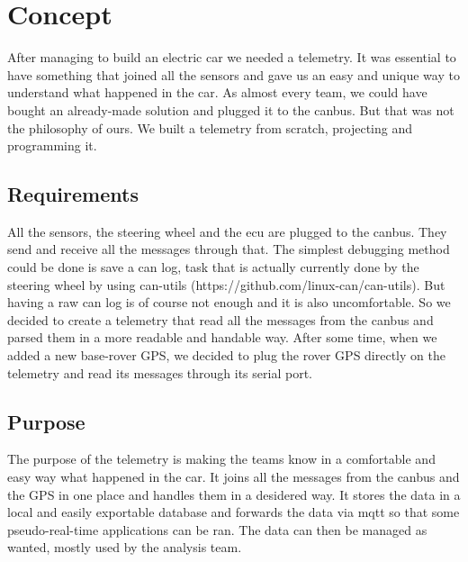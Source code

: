 \section{\huge{Concept}}
After managing to build an electric car we needed a telemetry. It was essential to have something that joined all the sensors and gave us an
easy and unique way to understand what happened in the car. As almost every team, we could have bought an already-made solution and plugged it
to the canbus. But that was not the philosophy of ours. We built a telemetry from scratch, projecting and programming it.

\subsection{Requirements}
All the sensors, the steering wheel and the ecu are plugged to the canbus. They send and receive all the messages through that. The simplest 
debugging method could be done is save a can log, task that is actually currently done by the steering wheel by using can-utils (https://github.com/linux-can/can-utils).
But having a raw can log is of course not enough and it is also uncomfortable. So we decided to create a telemetry that read all the messages 
from the canbus and parsed them in a more readable and handable way. After some time, when we added a new base-rover GPS, we decided to plug the
rover GPS directly on the telemetry and read its messages through its serial port.

\subsection{Purpose}
The purpose of the telemetry is making the teams know in a comfortable and easy way what happened in the car. It joins all the messages from the canbus
and the GPS in one place and handles them in a desidered way. It stores the data in a local and easily exportable database and forwards the data 
via mqtt so that some pseudo-real-time applications can be ran. The data can then be managed as wanted, mostly used by the analysis team.